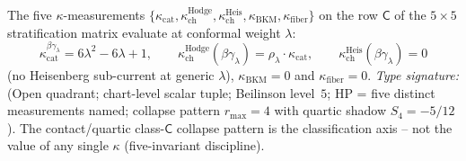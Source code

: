 \begin{remark}
\label{rem:betagamma-five-kappa-stratification}
The five $\kappa$-measurements
$\{\kappa_{\mathrm{cat}}, \kappa^{\mathrm{Hodge}}_{\mathrm{ch}},
\kappa^{\mathrm{Heis}}_{\mathrm{ch}}, \kappa_{\mathrm{BKM}},
\kappa_{\mathrm{fiber}}\}$ on the row $\mathsf{C}$ of the
$5\times 5$ stratification matrix evaluate at conformal weight
$\lambda$:
\[
\kappa_{\mathrm{cat}}^{\beta\gamma_\lambda}=
6\lambda^2-6\lambda+1,
\qquad
\kappa^{\mathrm{Hodge}}_{\mathrm{ch}}(\beta\gamma_\lambda)=
\rho_\lambda\cdot\kappa_{\mathrm{cat}},
\qquad
\kappa^{\mathrm{Heis}}_{\mathrm{ch}}(\beta\gamma_\lambda)=0
\]
(no Heisenberg sub-current at generic $\lambda$),
$\kappa_{\mathrm{BKM}}=0$ and $\kappa_{\mathrm{fiber}}=0$.
\emph{Type signature:} (Open quadrant; chart-level scalar tuple;
Beilinson level~$5$; HP = five distinct measurements named;
collapse pattern $r_{\max}=4$ with quartic shadow $S_4=-5/12$).
The contact/quartic class-$\mathsf{C}$ collapse pattern is the
classification axis -- not the value of any single $\kappa$
(five-invariant discipline).
\end{remark}

